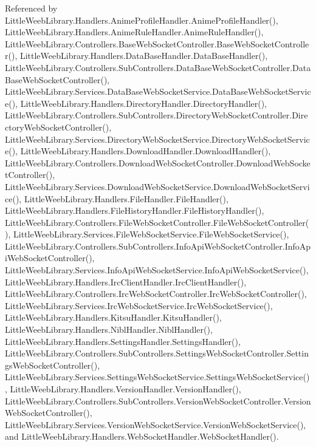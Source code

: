 Referenced by Little\+Weeb\+Library.\+Handlers.\+Anime\+Profile\+Handler.\+Anime\+Profile\+Handler(), Little\+Weeb\+Library.\+Handlers.\+Anime\+Rule\+Handler.\+Anime\+Rule\+Handler(), Little\+Weeb\+Library.\+Controllers.\+Base\+Web\+Socket\+Controller.\+Base\+Web\+Socket\+Controller(), Little\+Weeb\+Library.\+Handlers.\+Data\+Base\+Handler.\+Data\+Base\+Handler(), Little\+Weeb\+Library.\+Controllers.\+Sub\+Controllers.\+Data\+Base\+Web\+Socket\+Controller.\+Data\+Base\+Web\+Socket\+Controller(), Little\+Weeb\+Library.\+Services.\+Data\+Base\+Web\+Socket\+Service.\+Data\+Base\+Web\+Socket\+Service(), Little\+Weeb\+Library.\+Handlers.\+Directory\+Handler.\+Directory\+Handler(), Little\+Weeb\+Library.\+Controllers.\+Sub\+Controllers.\+Directory\+Web\+Socket\+Controller.\+Directory\+Web\+Socket\+Controller(), Little\+Weeb\+Library.\+Services.\+Directory\+Web\+Socket\+Service.\+Directory\+Web\+Socket\+Service(), Little\+Weeb\+Library.\+Handlers.\+Download\+Handler.\+Download\+Handler(), Little\+Weeb\+Library.\+Controllers.\+Download\+Web\+Socket\+Controller.\+Download\+Web\+Socket\+Controller(), Little\+Weeb\+Library.\+Services.\+Download\+Web\+Socket\+Service.\+Download\+Web\+Socket\+Service(), Little\+Weeb\+Library.\+Handlers.\+File\+Handler.\+File\+Handler(), Little\+Weeb\+Library.\+Handlers.\+File\+History\+Handler.\+File\+History\+Handler(), Little\+Weeb\+Library.\+Controllers.\+File\+Web\+Socket\+Controller.\+File\+Web\+Socket\+Controller(), Little\+Weeb\+Library.\+Services.\+File\+Web\+Socket\+Service.\+File\+Web\+Socket\+Service(), Little\+Weeb\+Library.\+Controllers.\+Sub\+Controllers.\+Info\+Api\+Web\+Socket\+Controller.\+Info\+Api\+Web\+Socket\+Controller(), Little\+Weeb\+Library.\+Services.\+Info\+Api\+Web\+Socket\+Service.\+Info\+Api\+Web\+Socket\+Service(), Little\+Weeb\+Library.\+Handlers.\+Irc\+Client\+Handler.\+Irc\+Client\+Handler(), Little\+Weeb\+Library.\+Controllers.\+Irc\+Web\+Socket\+Controller.\+Irc\+Web\+Socket\+Controller(), Little\+Weeb\+Library.\+Services.\+Irc\+Web\+Socket\+Service.\+Irc\+Web\+Socket\+Service(), Little\+Weeb\+Library.\+Handlers.\+Kitsu\+Handler.\+Kitsu\+Handler(), Little\+Weeb\+Library.\+Handlers.\+Nibl\+Handler.\+Nibl\+Handler(), Little\+Weeb\+Library.\+Handlers.\+Settings\+Handler.\+Settings\+Handler(), Little\+Weeb\+Library.\+Controllers.\+Sub\+Controllers.\+Settings\+Web\+Socket\+Controller.\+Settings\+Web\+Socket\+Controller(), Little\+Weeb\+Library.\+Services.\+Settings\+Web\+Socket\+Service.\+Settings\+Web\+Socket\+Service(), Little\+Weeb\+Library.\+Handlers.\+Version\+Handler.\+Version\+Handler(), Little\+Weeb\+Library.\+Controllers.\+Sub\+Controllers.\+Version\+Web\+Socket\+Controller.\+Version\+Web\+Socket\+Controller(), Little\+Weeb\+Library.\+Services.\+Version\+Web\+Socket\+Service.\+Version\+Web\+Socket\+Service(), and Little\+Weeb\+Library.\+Handlers.\+Web\+Socket\+Handler.\+Web\+Socket\+Handler().

